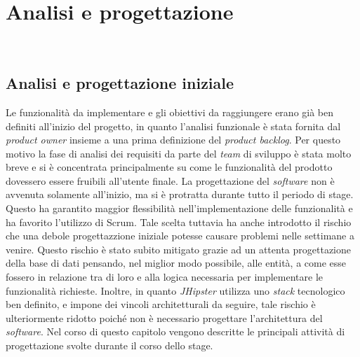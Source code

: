 
\chapter{Analisi e progettazione}
\label{cap:analisi}

\\


\section{Analisi e progettazione iniziale}
Le funzionalità da implementare e gli obiettivi da raggiungere erano già ben definiti all'inizio del progetto, in quanto l'analisi funzionale è stata fornita dal \textit{product owner} insieme a una prima definizione del \textit{product backlog}.
Per questo motivo la fase di analisi dei requisiti da parte del \textit{team} di sviluppo è stata molto breve e si è concentrata principalmente su come le funzionalità del prodotto dovessero essere fruibili all'utente finale. La progettazione del \textit{software} non è avvenuta solamente all'inizio, ma si è protratta durante tutto il periodo di stage. Questo ha garantito maggior flessibilità nell'implementazione delle funzionalità e ha favorito l'utilizzo di Scrum. Tale scelta tuttavia ha anche introdotto il rischio che una debole progettazzione iniziale potesse causare problemi nelle settimane a venire. Questo rischio è stato subito mitigato grazie ad un attenta progettazione della base di dati pensando, nel miglior modo possibile, alle entità, a come esse fossero in relazione tra di loro e alla logica necessaria per implementare le funzionalità richieste. Inoltre, in quanto \textit{JHipster} utilizza uno \textit{stack} tecnologico ben definito, e impone dei vincoli architetturali da seguire, tale rischio è ulteriormente ridotto poiché non è necessario progettare l'architettura del \textit{software}.
Nel corso di questo capitolo vengono descritte le principali attività di progettazione svolte durante il corso dello stage.


